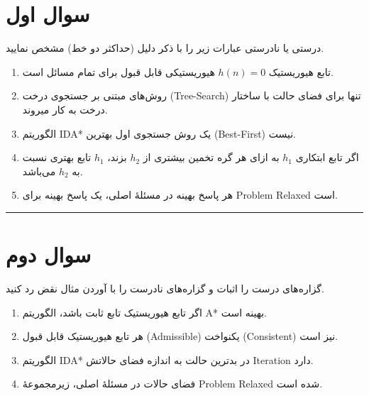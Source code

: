 \documentclass[a4paper,10pt]{article}
\begin{document}

\section{سوال اول}
درستی یا نادرستی عبارات زیر را با ذکر دلیل (حداکثر دو خط) مشخص نمایید.
\begin{enumerate}[label=\alph*-]
    \item تابع هیوریستیک $h(n)=0$ هیوریستیکی قابل قبول برای تمام مسائل است.
    \item روش‌های مبتنی بر جستجوی درخت (Tree-Search) تنها برای فضای حالت با ساختار درخت به کار میروند.
    \item الگوریتم IDA* یک روش جستجوی اول بهترین (Best-First) نیست.
    \item اگر تابع ابتکاری $h_1$ به ازای هر گره تخمین بیشتری از $h_2$ بزند، $h_1$ تابع بهتری نسبت به $h_2$ می‌باشد.
    \item هر پاسخ بهینه در مسئلۀ اصلی، یک پاسخ بهینه برای Problem Relaxed است.
\end{enumerate}


\bigskip
\rule{\linewidth}{0.4pt}

\section{سوال دوم}
گزاره‌های درست را اثبات و گزاره‌های نادرست را با آوردن مثال نقض رد کنید.
\begin{enumerate}[label=\alph*-]
    \item اگر تابع هیوریستیک تابع ثابت باشد، الگوریتم A* بهینه است.
    \item هر تابع هیوریستیک قابل قبول (Admissible) یکنواخت (Consistent) نیز است.
    \item الگوریتم IDA* در بدترین حالت به اندازه فضای حالاتش Iteration دارد.
    \item فضای حالات در مسئلۀ اصلی، زیرمجموعۀ Problem Relaxed شده است.
\end{enumerate}

\end{document}
